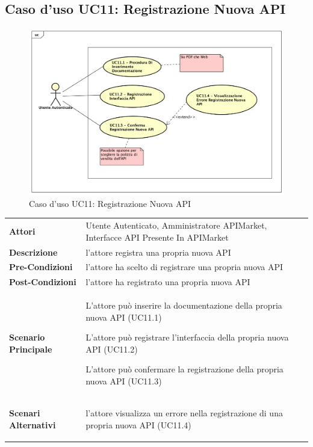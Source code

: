 \newpage
\subsection{Caso d'uso UC11: Registrazione Nuova API}
\label{UC11}
\begin{figure}[ht]
	\centering
	\includegraphics[scale=0.45]{UML/UC11.png}
	\caption{Caso d'uso UC11: Registrazione Nuova API}
\end{figure}

\renewcommand*{\arraystretch}{1.6}
\begin{longtable}{ l | p{11cm}}
	\hline
	\rowcolor{Gray}
	\multicolumn{2}{c}{Caso d'uso UC11: Registrazione Nuova API} \\
	\hline
	\textbf{Attori} &Utente Autenticato, Amministratore APIMarket, Interfacce API Presente In APIMarket \\
	\textbf{Descrizione} & l'attore registra una propria nuova API \\
	\textbf{Pre-Condizioni} &  l'attore ha scelto di registrare una propria nuova API\\
	\textbf{Post-Condizioni}&l'attore ha registrato una propria nuova API\\
	\textbf{Scenario Principale} & \begin{enumerate*}[label=(\arabic*.),itemjoin={\newline}]
		\item L'attore può inserire la documentazione della propria nuova API (UC11.1)
		\item L'attore può registrare l'interfaccia della propria nuova API (UC11.2)
		\item L'attore può confermare la registrazione della propria nuova API (UC11.3)
	\end{enumerate*}\\
	\textbf{Scenari Alternativi} & \begin{enumerate*}[label=(\arabic*.),itemjoin={\newline}]
		\item l'attore visualizza un errore nella registrazione di una propria nuova API (UC11.4)
	\end{enumerate*}\\
\end{longtable}





